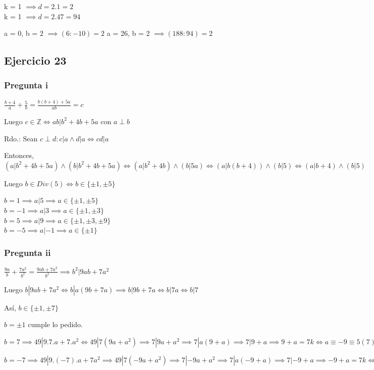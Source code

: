 k = 1 $ \implies d = 2.1 = 2 $ \\
k = 1 $ \implies d = 2.47 = 94 $

a = 0, b = 2 $ \implies (6:-10) = 2$
a = 26, b = 2 $ \implies (188:94) = 2$

\subsection{Ejercicio 23}
\subsubsection{Pregunta i}

$ \frac{b+4}{a} + \frac{5}{b} = \frac{b(b+4) + 5a}{ab} = c $

Luego $ c\in \mathbb{Z} \iff ab|b^2+4b+5a $ con $ a\perp b $

Rdo.: Sean $ c \perp d: c|a \wedge d|a \iff cd|a $

Entonces, $ (a|b^2+4b+5a) \wedge (b|b^2+4b+5a) \iff (a|b^2+4b) \wedge (b|5a) \iff (a|b(b+4)) \wedge (b|5)
\iff (a|b+4) \wedge (b|5) $

Luego $ b \in Div(5) \iff b \in \{ \pm 1, \pm 5 \} $

$ b=1 \implies a|5 \implies a \in \{ \pm 1, \pm 5 \}$ \\
$ b=-1 \implies a|3 \implies a \in \{ \pm 1, \pm 3 \}$ \\
$ b=5 \implies a|9 \implies a \in \{ \pm 1, \pm 3, \pm 9 \}$ \\
$ b=-5 \implies a|-1 \implies a \in \{ \pm 1 \}$

\subsubsection{Pregunta ii}
$ \frac{9a}{b} + \frac{7a^2}{b^2} = \frac{9ab + 7a^2}{b^2} \implies b^2|9ab + 7a^2 $

Luego $ b|9ab + 7a^2 \iff b|a(9b+7a) \implies b|9b+7a \iff b|7a \iff b|7 $

Así, $ b \in \{ \pm 1, \pm 7 \} $

$ b = \pm 1 $ cumple lo pedido.

$ b = 7 \implies 49|9.7.a+7.a^2 \iff 49|7(9a+a^2) \implies 7|9a+a^2 \implies 7|a(9+a) \implies 7|9+a 
\implies 9+a = 7k \iff a \equiv -9 \equiv 5(7) $

$ b = -7 \implies 49|9.(-7).a+7a^2 \implies 49|7(-9a+a^2) \implies 7|-9a+a^2 \implies 7|a(-9+a) \implies 7|-9+a 
\implies -9+a = 7k \iff a \equiv 9 \equiv 2 (7)$

